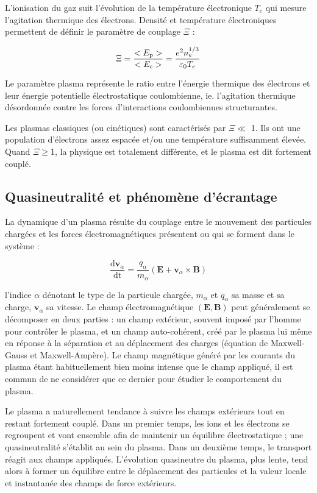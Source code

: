 \begin{refsection}
L'ionisation du gaz suit l'évolution de la température électronique $T_{e}$
qui mesure l'agitation thermique des électrons. Densité et température
électroniques permettent de définir le paramètre de couplage $\Xi$ :

\begin{equation}
\label{1-paramPlasma}
\Xi=\frac{<E_\text{p}>}{<E_\text{c}>}=\frac{e^{{2}}
n_{e}^{{1/3}}}{\varepsilon{_{0}} T_{e}}
\end{equation}

Le paramètre plasma représente le ratio entre l'énergie thermique des
électrons et leur énergie potentielle électrostatique coulombienne, ie.
l'agitation thermique désordonnée contre les forces d'interactions
coulombiennes structurantes.

Les plasmas classiques (ou cinétiques) sont caractérisés par
$\Xi\ll$ 1. Ils ont une population d'électrons assez espacée et/ou une
température suffisamment élevée. Quand $\Xi\geq$1, la physique est totalement
différente, et le plasma est dit fortement couplé.

\subsection{Quasineutralité et phénomène d'écrantage}
La dynamique d'un plasma résulte du couplage entre le mouvement des
particules chargées et les forces électromagnétiques présentent ou qui se
forment dans le système :

\begin{equation}
\frac{\text{d} \mathbf
v_\alpha}{\text{dt}}=\frac{q_\alpha}{m_\alpha}(\mathbf E+ \mathbf
v_\alpha\times\mathbf B)
\end{equation}

l'indice $\alpha$ dénotant le type de la particule chargée, $m_\alpha$
et $q_\alpha$ sa masse et sa charge, $\mathbf v_\alpha$ sa vitesse. Le champ
électromagnétique $(\mathbf E,\mathbf B)$ peut généralement se décomposer en
deux parties :
un champ extérieur, souvent imposé par l'homme pour
contrôler le plasma, et un champ auto-cohérent, créé par le plasma lui même en
réponse à la séparation et au déplacement des charges (équation de
Maxwell-Gauss et Maxwell-Ampère).
Le champ magnétique généré par les courants du plasma étant
habituellement bien moins intense que le champ appliqué, il est commun de
ne considérer que ce dernier pour étudier le comportement du plasma.

Le plasma a naturellement tendance à suivre les champs extérieurs tout en
restant fortement couplé. Dans un premier temps, les ions et les électrons
se regroupent et vont ensemble afin de maintenir un équilibre électrostatique ;
une quasineutralité s'établit au sein du plasma. Dans un deuxième temps,
le transport réagit aux champs appliqués. L'évolution quasineutre du plasma,
plus lente, tend alors à former un équilibre entre le déplacement des particules
et la valeur locale et instantanée des champs de force extérieurs.


\end{refsection}
